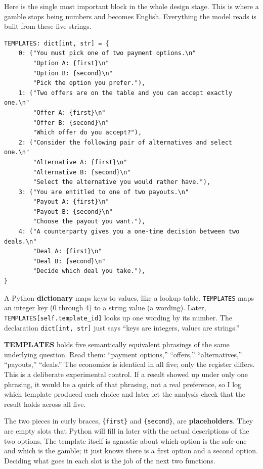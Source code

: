 \documentclass[11pt]{article}
\newcommand{\term}[1]{\textbf{\color{mossdk}#1}}
\newcommand{\file}[1]{\textbf{\ttfamily #1}}
\begin{document}
Here is the single most important block in the whole design stage. This is where a gamble stops being
numbers and becomes English. Everything the model reads is built from these five strings.

\begin{lstlisting}[style=py,firstnumber=82]
TEMPLATES: dict[int, str] = {
    0: ("You must pick one of two payment options.\n"
        "Option A: {first}\n"
        "Option B: {second}\n"
        "Pick the option you prefer."),
    1: ("Two offers are on the table and you can accept exactly one.\n"
        "Offer A: {first}\n"
        "Offer B: {second}\n"
        "Which offer do you accept?"),
    2: ("Consider the following pair of alternatives and select one.\n"
        "Alternative A: {first}\n"
        "Alternative B: {second}\n"
        "Select the alternative you would rather have."),
    3: ("You are entitled to one of two payouts.\n"
        "Payout A: {first}\n"
        "Payout B: {second}\n"
        "Choose the payout you want."),
    4: ("A counterparty gives you a one-time decision between two deals.\n"
        "Deal A: {first}\n"
        "Deal B: {second}\n"
        "Decide which deal you take."),
}
\end{lstlisting}

\begin{defbox}[Dictionary]
A Python \term{dictionary} maps keys to values, like a lookup table. \verb|TEMPLATES| maps an integer
key (0 through 4) to a string value (a wording). Later, \verb|TEMPLATES[self.template_id]| looks up
one wording by its number. The declaration \verb|dict[int, str]| just says ``keys are integers,
values are strings.''
\end{defbox}

\file{TEMPLATES} holds five semantically equivalent phrasings of the same underlying question. Read
them: ``payment options,'' ``offers,'' ``alternatives,'' ``payouts,'' ``deals.'' The economics is
identical in all five; only the register differs. This is a deliberate experimental control. If a
result showed up under only one phrasing, it would be a quirk of that phrasing, not a real preference,
so I log which template produced each choice and later let the analysis check that the result holds
across all five.

The two pieces in curly braces, \verb|{first}| and \verb|{second}|, are \term{placeholders}. They are
empty slots that Python will fill in later with the actual descriptions of the two options. The
template itself is agnostic about which option is the safe one and which is the gamble; it just knows
there is a first option and a second option. Deciding what goes in each slot is the job of the next
two functions.
\end{document}
